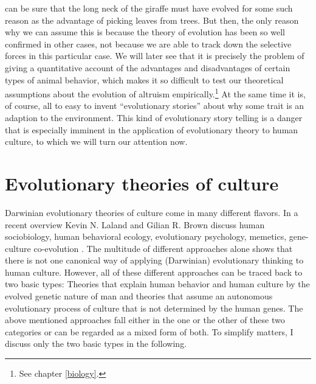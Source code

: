 can be sure that the long neck of the giraffe must have evolved for some such
reason as the advantage of picking leaves from trees. But then, the only
reason why we can assume this is because the theory of evolution has been so
well confirmed in other cases, not because we are able to track down the
selective forces in this particular case. We will later see that it is
precisely the problem of giving a quantitative account of the advantages and
disadvantages of certain types of animal behavior, which makes it so
difficult to test our theoretical assumptions about the evolution of altruism
empirically.\footnote{See chapter \ref{biology}.}  At the same time it is, of
course, all to easy to invent ``evolutionary stories'' about why some trait is
an adaption to the environment. This kind of evolutionary story telling is a
danger that is especially imminent in the application of evolutionary theory
to human culture, to which we will turn our attention now.

\section{Evolutionary theories of culture}
\label{culturalEvolution}

Darwinian evolutionary theories of culture come in many different flavors. In
a recent overview Kevin N. Laland and Gilian R. Brown discuss human
sociobiology, human behavioral ecology, evolutionary psychology, memetics,
gene-culture co-evolution \cite[]{laland-brown:2004}. The multitude of
different approaches alone shows that there is not one canonical way of
applying (Darwinian) evolutionary thinking to human culture. However, all of
these different approaches can be traced back to two basic types: Theories that
explain human behavior and human culture by the evolved genetic nature of man
and theories that assume an autonomous evolutionary process of culture that is
not determined by the human genes. The above mentioned approaches fall either
in the one or the other of these two categories or can be regarded as a mixed
form of both. To simplify matters, I discuss only the
two basic types in the following.

